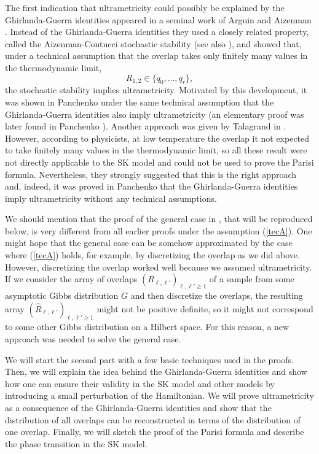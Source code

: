 \documentclass[12pt]{article}
\theoremstyle{nonumberplain}
\begin{document}
The first indication that ultrametricity could possibly be explained by the Ghirlanda-Guerra identities appeared in a seminal work of Arguin and Aizenman \cite{AA}. Instead of the Ghirlanda-Guerra identities they used a closely related property, called the Aizenman-Contucci stochastic stability \cite{AC} (see also \cite{Contucci}), and showed that, under a  technical assumption that the overlap takes only finitely many values in the thermodynamic limit, 
\begin{equation}
R_{1,2} \in \{q_0,\ldots, q_r \},
\label{tecA}
\end{equation}
the stochastic stability implies ultrametricity. Motivated by this development, it was shown in Panchenko \cite{PGG} under the same technical assumption that the Ghirlanda-Guerra identities also imply ultrametricity (an elementary proof was later found in Panchenko \cite{PGG2}). Another approach was given by Talagrand in \cite{Tal-New}. However, according to physicists, at low temperature the overlap it not expected to take finitely many values in the thermodynamic limit, so all these result were not directly applicable to the SK model and could not be used to prove the Parisi formula. Nevertheless, they strongly suggested that this is the right approach and, indeed, it was proved in Panchenko \cite{PUltra} that the Ghirlanda-Guerra identities imply ultrametricity without any technical assumptions. 

We should mention that the proof of the general case in \cite{PUltra}, that will be reproduced below, is very different from all earlier proofs under the assumption (\ref{tecA}). One might hope that the general case can be somehow approximated by the case where (\ref{tecA}) holds, for example, by discretizing the overlap as we did above. However, discretizing the overlap worked well because we assumed ultrametricity. If we consider the array of overlaps $(R_{\ell,\ell'})_{\ell,\ell'\geq 1}$ of a sample from some asymptotic Gibbs distribution $G$ and then discretize the overlaps, the resulting array $(\hat{R}_{\ell,\ell'})_{\ell,\ell'\geq 1}$ might not be positive definite, so it might not correspond to some other Gibbs distribution on a Hilbert space. For this reason, a new approach was needed to solve the general case.

We will start the second part with a few basic techniques used in the proofs. Then, we will explain the idea behind the Ghirlanda-Guerra identities and show how one can ensure their validity in the SK model and other models by introducing a small perturbation of the Hamiltonian. We will prove ultrametricity as a consequence of the Ghirlanda-Guerra identities and show that the distribution of all overlaps can be reconstructed in terms of the distribution of one overlap. Finally, we will sketch the proof of the Parisi formula and describe the phase transition in the SK model.
\end{document}
